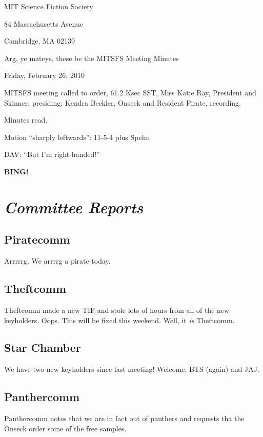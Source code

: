 \documentclass[10pt]{article}
\newcommand{\bing}{{\bf BING!} }
\newcommand{\goto}[1]{\bing \vskip 12pt \section*{{\em{#1}}}}
\newcommand{\ps}{ plus Spehn\xspace}
\newcommand{\skinner}{Miss Katie Ray, President and Skinner}
\newcommand{\onseck}{Kendra Beckler, Onseck and Resident Pirate}
\newcommand{\meetingdate}{Friday, February 26, 2010}
\begin{document}
\begin{center}

MIT Science Fiction Society

84 Massachusetts Avenue

Cambridge, MA 02139

\vspace{12pt}

Arg, ye mateys, these be the MITSFS Meeting Minutes

\meetingdate

\end{center}

\vspace{18pt}

\setlength{\parskip}{6pt}

\noindent
MITSFS meeting called to order, 61.2 Ksec SST,
\skinner, presiding; \onseck, recording.

Minutes read.

Motion ``sharply leftwards'': 11-5-4 \ps

DAV: ``But I'm right-handed!''

\goto{Committee Reports}

\subsection*{Piratecomm}

Arrrrrg.  We arrrrg a pirate today.

\subsection*{Theftcomm}

Theftcomm made a new TIF and stole lots of hours from all of the new keyholders.  Oops.  This will be fixed this weekend.  Well, it \textit{is} Theftcomm.

\subsection*{Star Chamber}

We have two new keyholders since last meeting!  Welcome, BTS (again) and JAJ.

\subsection*{Panthercomm}

Panthercomm notes that we are in fact out of panthers and requests tha the Onseck order some of the free samples.
\end{document}
